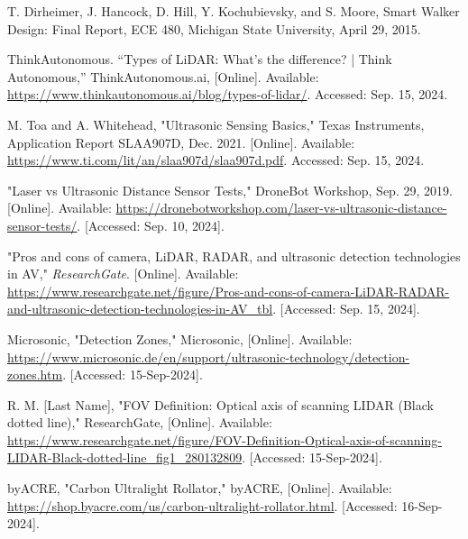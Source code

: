 \begin{thebibliography}{45}
	 T. Dirheimer, J. Hancock, D. Hill, Y. Kochubievsky, and S. Moore, Smart Walker Design: Final Report, ECE 480, Michigan State University, April 29, 2015.
	
	 ThinkAutonomous. “Types of LiDAR: What's the difference? | Think Autonomous,” ThinkAutonomous.ai, [Online]. Available: \href{https://www.thinkautonomous.ai/blog/types-of-lidar/}{https://www.thinkautonomous.ai/blog/types-of-lidar/}. Accessed: Sep. 15, 2024.
	
	 M. Toa and A. Whitehead, "Ultrasonic Sensing Basics," Texas Instruments, Application Report SLAA907D, Dec. 2021. [Online]. Available: \href{https://www.ti.com/lit/an/slaa907d/slaa907d.pdf}{https://www.ti.com/lit/an/slaa907d/slaa907d.pdf}. Accessed: Sep. 15, 2024.
	
	 "Laser vs Ultrasonic Distance Sensor Tests," DroneBot Workshop, Sep. 29, 2019. [Online]. Available: \href{https://dronebotworkshop.com/laser-vs-ultrasonic-distance-sensor-tests/}{https://dronebotworkshop.com/laser-vs-ultrasonic-distance-sensor-tests/}. [Accessed: Sep. 10, 2024].
	
	 "Pros and cons of camera, LiDAR, RADAR, and ultrasonic detection technologies in AV," \textit{ResearchGate}. [Online]. Available: \href{https://www.researchgate.net/figure/Pros-and-cons-of-camera-LiDAR-RADAR-and-ultrasonic-detection-technologies-in-AV\_tbl}{https://www.researchgate.net/figure/Pros-and-cons-of-camera-LiDAR-RADAR-and-ultrasonic-detection-technologies-in-AV\_tbl}. [Accessed: Sep. 15, 2024].
	
	 Microsonic, "Detection Zones," Microsonic, [Online]. Available: \href{https://www.microsonic.de/en/support/ultrasonic-technology/detection-zones.htm}{https://www.microsonic.de/en/support/ultrasonic-technology/detection-zones.htm}. [Accessed: 15-Sep-2024].
	
	 R. M. [Last Name], "FOV Definition: Optical axis of scanning LIDAR (Black dotted line)," ResearchGate, [Online]. Available: \href{https://www.researchgate.net/figure/FOV-Definition-Optical-axis-of-scanning-LIDAR-Black-dotted-line\_fig1\_280132809}{https://www.researchgate.net/figure/FOV-Definition-Optical-axis-of-scanning-LIDAR-Black-dotted-line\_fig1\_280132809}. [Accessed: 15-Sep-2024].
	
	 byACRE, "Carbon Ultralight Rollator," byACRE, [Online]. Available: \href{https://shop.byacre.com/us/carbon-ultralight-rollator.html}{https://shop.byacre.com/us/carbon-ultralight-rollator.html}. [Accessed: 16-Sep-2024].
	

\end{thebibliography}
